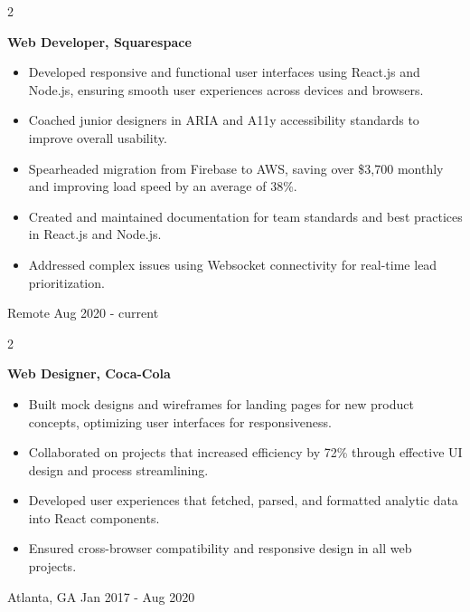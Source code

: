 \documentclass[10pt, letterpaper]{article}
\newenvironment{highlights}{
    \begin{itemize}[
        topsep=0.10 cm,
        parsep=0.10 cm,
        partopsep=0pt,
        itemsep=0pt,
        leftmargin=0.4 cm + 10pt
    ]
}{
    \end{itemize}
} %
\newenvironment{twocolentry}[2][]{
    \onecolentry
    \def\secondColumn{#2}
    \setcolumnwidth{\fill, 4.5 cm}
    \begin{paracol}{2}
}{
    \switchcolumn \raggedleft \secondColumn
    \end{paracol}
    \endonecolentry
} %
\begin{document}
        \begin{twocolentry}{
            Remote
        Aug 2020 - current
        }
            \textbf{Web Developer, Squarespace}
            \begin{highlights}
                \item Developed responsive and functional user interfaces using React.js and Node.js, ensuring smooth user experiences across devices and browsers.
                \item Coached junior designers in ARIA and A11y accessibility standards to improve overall usability.
                \item Spearheaded migration from Firebase to AWS, saving over \$3,700 monthly and improving load speed by an average of 38\%.
                \item Created and maintained documentation for team standards and best practices in React.js and Node.js.
                \item Addressed complex issues using Websocket connectivity for real-time lead prioritization.
            \end{highlights}
        \end{twocolentry}

        \vspace{0.2 cm}

        \begin{twocolentry}{
            Atlanta, GA
        Jan 2017 - Aug 2020
        }
            \textbf{Web Designer, Coca-Cola}
            \begin{highlights}
                \item Built mock designs and wireframes for landing pages for new product concepts, optimizing user interfaces for responsiveness.
                \item Collaborated on projects that increased efficiency by 72\% through effective UI design and process streamlining.
                \item Developed user experiences that fetched, parsed, and formatted analytic data into React components.
                \item Ensured cross-browser compatibility and responsive design in all web projects.
            \end{highlights}
        \end{twocolentry}

        \vspace{0.2 cm}
\end{document}
